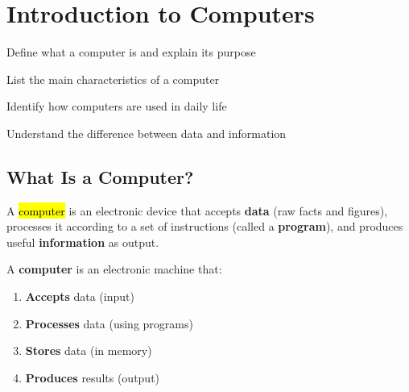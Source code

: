 
\chapter{Introduction to Computers}
\label{ch:intro-computers}

\begin{objectives}
  \item Define what a computer is and explain its purpose
  \item List the main characteristics of a computer
  \item Identify how computers are used in daily life
  \item Understand the difference between data and information
\end{objectives}


\section{What Is a Computer?}
\label{sec:what-is-computer}

A \hl{computer} is an electronic device that accepts \textbf{data} (raw facts and figures), processes it according to a set of instructions (called a \textbf{program}), and produces useful \textbf{information} as output.

\begin{theorybox}
A \textbf{computer} is an electronic machine that:
\begin{enumerate}[label=\textcolor{ModuleBlue}{\arabic*.}, itemsep=2pt]
  \item \textbf{Accepts} data (input)
  \item \textbf{Processes} data (using programs)
  \item \textbf{Stores} data (in memory)
  \item \textbf{Produces} results (output)
\end{enumerate}
\end{theorybox}

